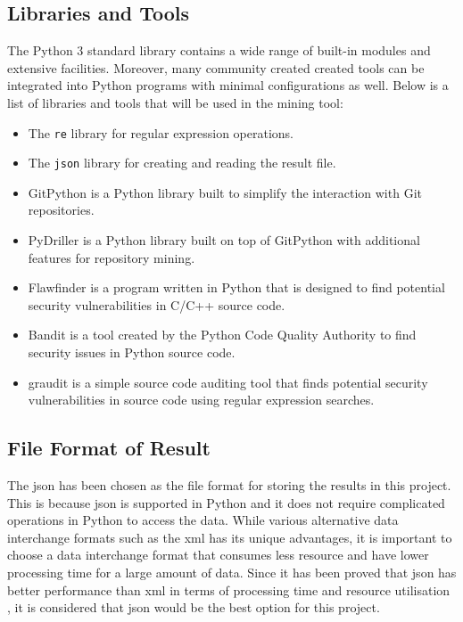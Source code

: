 \documentclass[12pt, a4paper]{report}
\begin{document}
\subsection{Libraries and Tools}
The Python 3 standard library contains a wide range of built-in modules and extensive facilities.
Moreover, many community created created tools can be integrated into Python programs with minimal
configurations as well. Below is a list of libraries and tools that will be used in the mining tool:
\begin{itemize}
  \item The \texttt{re} \cite{python_re} library for regular expression operations.
  \item The \texttt{json} \cite{python_json} library for creating and reading the result file.
  \item GitPython \cite{gitpython} is a Python library built to simplify the interaction with Git
  repositories.
  \item PyDriller \cite{pydriller_repo, spadini_2018} is a Python library built on top of GitPython
  with additional features for repository mining.
  \item Flawfinder \cite{flawfinder} is a program written in Python that is designed to find
  potential security vulnerabilities in C/C++ source code.
  \item Bandit \cite{bandit} is a tool created by the Python Code Quality Authority to find security
  issues in Python source code.
  \item graudit \cite{graudit} is a simple source code auditing tool that finds potential security
  vulnerabilities in source code using regular expression searches.
\end{itemize}

\subsection{File Format of Result} \label{subsec:file_format}
The \acrfull{json} \cite{json} has been chosen as the file format for storing the results in this
project. This is because \acrshort{json} is supported in Python and it does not require complicated
operations in Python to access the data. While various alternative data interchange formats such as
the \acrfull{xml} \cite{xml} has its unique advantages, it is important to choose a data interchange
format that consumes less resource and have lower processing time for a large amount of data. Since
it has been proved that \acrshort{json} has better performance than \acrshort{xml} in terms of
processing time and resource utilisation \cite{nurseitov_2009}, it is considered that
\acrshort{json} would be the best option for this project.
\end{document}
